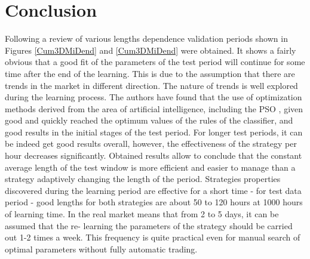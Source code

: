 \documentclass{tewiart}
\begin{document}
\section{Conclusion}

Following a review of various lengths dependence validation periods shown in Figures \ref{Cum3DMiDend} and \ref{Cum3DMiDend} were obtained. It shows a fairly obvious that a good fit of the parameters of the test period will continue for some time after the end of the learning. This is due to the assumption that there are trends in the market in different direction. The nature of trends is well explored during the learning process. The authors have found that the use of optimization methods derived from the area of artificial intelligence, including the PSO \cite{Kennedy}, given good and quickly reached the optimum values of the rules of the classifier, and good results in the initial stages of the test period. For longer test periods, it can be indeed get good results overall, however, the effectiveness of the strategy per hour decreases significantly. Obtained results allow to conclude that the constant average length of the test window is more efficient and easier to manage than a strategy adaptively changing the length of the period. Strategies properties discovered during the learning period are effective for a short time - for test data period - good lengths for both strategies are about 50 to 120 hours at 1000 hours of learning time. In the real market means that from 2 to 5 days, it can be assumed that the re- learning the parameters of the strategy should be carried out 1-2 times a week. This frequency is quite practical even for manual search of optimal parameters without fully automatic trading.\\
\end{document}
